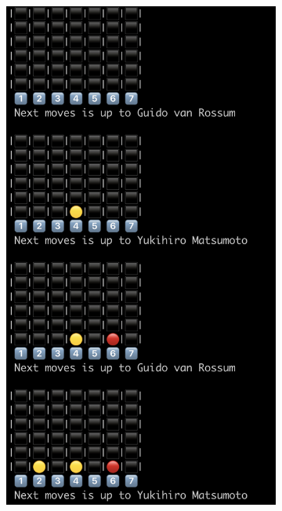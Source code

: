 \documentclass{article}
\begin{document}
  \begin{figure}
    \centering
    
    \begin{subfigure}{0.45\textwidth}
      \includegraphics[width=\linewidth]{img/gamestart.png}
      \subcaption{}
    \end{subfigure}\hfil
    \begin{subfigure}{0.45\textwidth}

\end{subfigure}
\end{figure}
\end{document}
